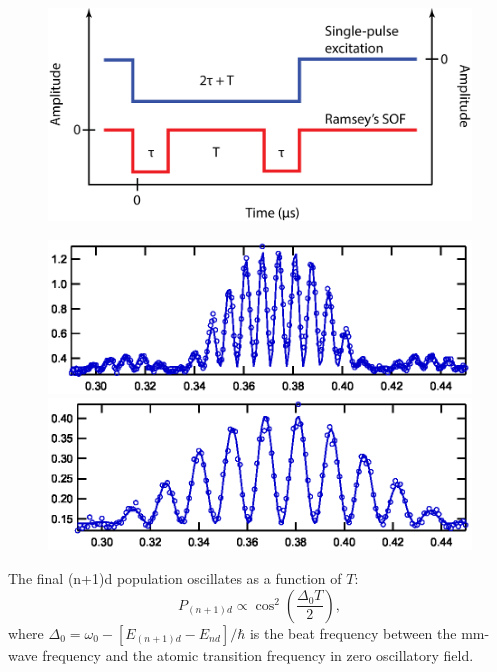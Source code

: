 \documentclass[landscape]{sciposter}
\begin{document}
\begin{multicols}{4}
\begin{figure}
\begin{center}
\includegraphics[scale=1]{Ramsey_excitation.png}
\end{center}
\end{figure}
\begin{figure}
	\begin{center}
		\includegraphics[scale=1.5]{32d52_ramsey_1.eps}
		\includegraphics[scale=1.5]{32d52_ramsey_2.eps}
	\end{center}
\end{figure}
\noindent The final (n+1)d population oscillates as a function of $T$: 
{\Large
$$P_{(n+1)d} \propto {\cos}^{2}\left(\frac{\Delta_{0} T}{2}\right),$$}
where $\Delta_0=\omega_0-[E_{(n+1)d}-E_{nd}]/\hbar$ is the beat frequency between the mm-wave frequency and the atomic transition frequency in zero oscillatory field.
 

\end{multicols}
\end{document}
